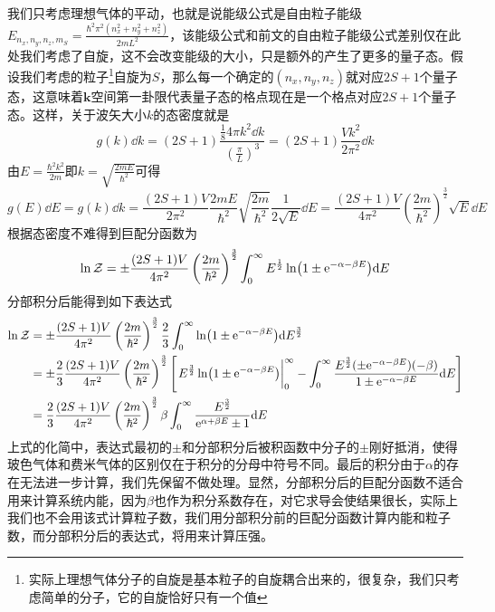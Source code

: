 \documentclass[../../main.tex]{subfiles}
\begin{document}
我们只考虑理想气体的平动，也就是说能级公式是自由粒子能级\(E_{n_x,n_y,n_z,m_S}=\frac{\hbar^2\pi^2(n_x^2+n_y^2+n_z^2)}{2mL^2}\)，该能级公式和前文的自由粒子能级公式差别仅在此处我们考虑了自旋，这不会改变能级的大小，只是额外的产生了更多的量子态。假设我们考虑的粒子\footnote{实际上理想气体分子的自旋是基本粒子的自旋耦合出来的，很复杂，我们只考虑简单的分子，它的自旋恰好只有一个值}自旋为\(S\)，那么每一个确定的\((n_x,n_y,n_z)\)就对应\(2S+1\)个量子态，这意味着\(\bm{k}\)空间第一卦限代表量子态的格点现在是一个格点对应\(2S+1\)个量子态。这样，关于波矢大小\(k\)的态密度就是
\begin{equation}
    g(k)\dd k=(2S+1)\frac{\frac{1}{8}4\pi k^2\dd k}{\left(\frac{\pi}{L}\right)^3}=(2S+1)\frac{Vk^2}{2\pi^2}\dd k
\end{equation}
由\(E=\frac{\hbar^2k^2}{2m}\)即\(k=\sqrt{\frac{2mE}{\hbar^2}}\)可得
\begin{equation}
    g(E)\dd E=g(k)\dd k=\frac{(2S+1)V}{2\pi^2}\frac{2mE}{\hbar^2}\sqrt{\frac{2m}{\hbar^2}}\frac{1}{2\sqrt{E}}\dd E=\frac{(2S+1)V}{4\pi^2}\left(\frac{2m}{\hbar^2}\right)^{\frac{3}{2}}\sqrt{E}\dd E
\end{equation}
根据态密度不难得到巨配分函数为
\begin{equation}
    \ln\mathcal{Z}=\pm\frac{(2S+1)V}{4\pi^2}\left(\frac{2m}{\hbar^2}\right)^{\frac{3}{2}}\int_0^{\infty}E^{\frac{1}{2}}\ln(1\pm\mathrm{e}^{-\alpha-\beta E})\dd E
\end{equation}
分部积分后能得到如下表达式
\begin{equation}
    \begin{split}
        \ln\mathcal{Z}&=\pm\frac{(2S+1)V}{4\pi^2}\left(\frac{2m}{\hbar^2}\right)^{\frac{3}{2}}\frac{2}{3}\int_0^{\infty}\ln(1\pm\e^{-\alpha-\beta E})\dd E^{\frac{3}{2}} \\
        &=\pm\frac{2}{3}\frac{(2S+1)V}{4\pi^2}\left(\frac{2m}{\hbar^2}\right)^{\frac{3}{2}}\left[\eval{E^{\frac{3}{2}}\ln(1\pm\e^{-\alpha-\beta E})}_{0}^{\infty}-\int_0^{\infty}\frac{E^{\frac{3}{2}}(\pm\e^{-\alpha-\beta E})(-\beta)}{1\pm\e^{-\alpha-\beta E}}\dd E\right] \\
        &=\frac{2}{3}\frac{(2S+1)V}{4\pi^2}\left(\frac{2m}{\hbar^2}\right)^{\frac{3}{2}}\beta\int_0^{\infty}\frac{E^{\frac{3}{2}}}{\e^{\alpha+\beta E}\pm1}\dd E
    \end{split}
\end{equation}
上式的化简中，表达式最初的\(\pm\)和分部积分后被积函数中分子的\(\pm\)刚好抵消，使得玻色气体和费米气体的区别仅在于积分的分母中符号不同。最后的积分由于\(\alpha\)的存在无法进一步计算，我们先保留不做处理。显然，分部积分后的巨配分函数不适合用来计算系统内能，因为\(\beta\)也作为积分系数存在，对它求导会使结果很长，实际上我们也不会用该式计算粒子数，我们用分部积分前的巨配分函数计算内能和粒子数，而分部积分后的表达式，将用来计算压强。
\end{document}
